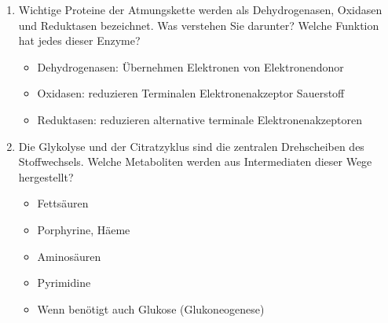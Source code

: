 \begin{enumerate}
	\item Wichtige Proteine der Atmungskette werden als Dehydrogenasen, Oxidasen und Reduktasen bezeichnet. Was verstehen Sie darunter? Welche Funktion hat jedes dieser Enzyme?
		\begin{itemize}
			\item Dehydrogenasen: \"Ubernehmen Elektronen von Elektronendonor
			\item Oxidasen: reduzieren Terminalen Elektronenakzeptor Sauerstoff
			\item Reduktasen: reduzieren alternative terminale Elektronenakzeptoren
		\end{itemize}
	\item Die Glykolyse und der Citratzyklus sind die zentralen Drehscheiben des Stoffwechsels. Welche Metaboliten werden aus Intermediaten dieser Wege hergestellt?
		\begin{itemize}
			\item Fetts\"auren
			\item Porphyrine, H\"aeme
			\item Aminos\"auren
			\item Pyrimidine
			\item Wenn ben\"otigt auch Glukose (Glukoneogenese)
		\end{itemize}
\end{enumerate}
